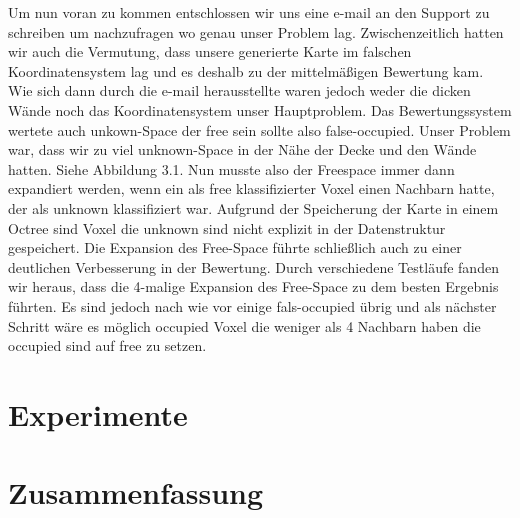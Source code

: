 \documentclass[12pt,titlepage, a4paper]{article}
\begin{document}
Um nun voran zu kommen entschlossen wir uns eine e-mail an den Support zu schreiben um nachzufragen wo genau unser Problem lag.
Zwischenzeitlich hatten wir auch die Vermutung, dass unsere generierte Karte im falschen Koordinatensystem lag und es deshalb zu der mittelmäßigen Bewertung kam.
Wie sich dann durch die e-mail herausstellte waren jedoch weder die dicken Wände noch das Koordinatensystem unser Hauptproblem. Das Bewertungssystem wertete auch unkown-Space der free sein sollte also false-occupied. Unser Problem war, dass wir zu viel unknown-Space in der Nähe der Decke und den Wände hatten. Siehe Abbildung 3.1.
Nun musste also der Freespace immer dann expandiert werden, wenn ein als free klassifizierter Voxel einen Nachbarn hatte, der als unknown klassifiziert war. Aufgrund der Speicherung der Karte in einem Octree sind Voxel die unknown sind nicht explizit in der Datenstruktur gespeichert. Die Expansion des Free-Space führte schließlich auch zu einer deutlichen Verbesserung in der Bewertung. Durch verschiedene Testläufe fanden wir heraus, dass die 4-malige Expansion des Free-Space zu dem besten Ergebnis führten. Es sind jedoch nach wie vor einige fals-occupied übrig und als nächster Schritt wäre es möglich occupied Voxel die weniger als 4 Nachbarn haben die occupied sind auf free zu setzen.

\section{Experimente}

\section{Zusammenfassung}

  
  
\end{document}

